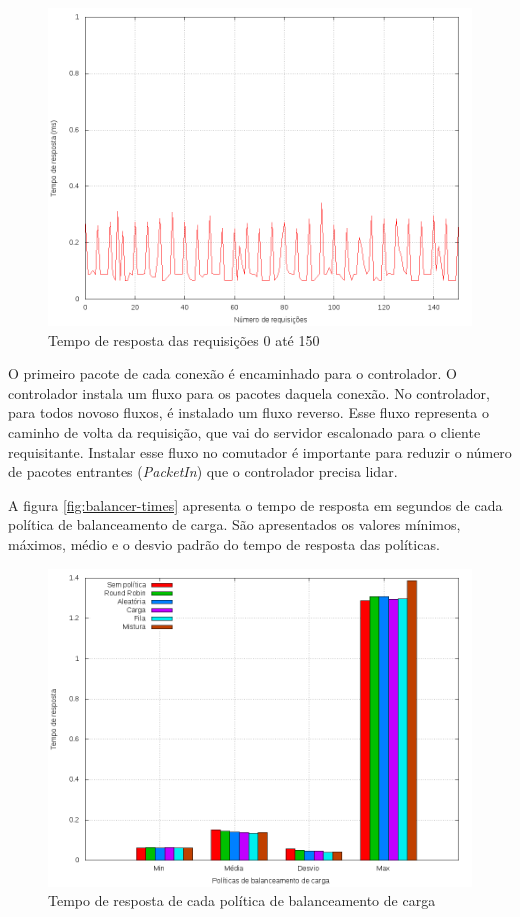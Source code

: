 \begin{figure}[htb!]
    \centering
    \includegraphics[width=\linewidth]{img/balancer-http-zoom}
    \caption{Tempo de resposta das requisições 0 até 150}
    \label{fig:balancer-http-zoom}
\end{figure}

O primeiro pacote de cada conexão é encaminhado para o controlador.
O controlador instala um fluxo para os pacotes daquela conexão.
No controlador, para todos novoso fluxos, é instalado um fluxo reverso.
Esse fluxo representa o caminho de volta da requisição, que vai do servidor
escalonado para o cliente requisitante.
Instalar esse fluxo no comutador é importante para reduzir o número de 
pacotes entrantes (\emph{PacketIn}) que o controlador precisa lidar.

A figura \ref{fig:balancer-times} apresenta o tempo de resposta em segundos
de cada política de balanceamento de carga.
São apresentados os valores mínimos, máximos, médio e o desvio padrão do 
tempo de resposta das políticas.

\begin{figure}[htb!]
    \centering
    \includegraphics[width=\linewidth]{img/balancer-http-times}
    \caption{Tempo de resposta de cada política de balanceamento de carga}
    \label{fig:balancer-http-times}
\end{figure}

